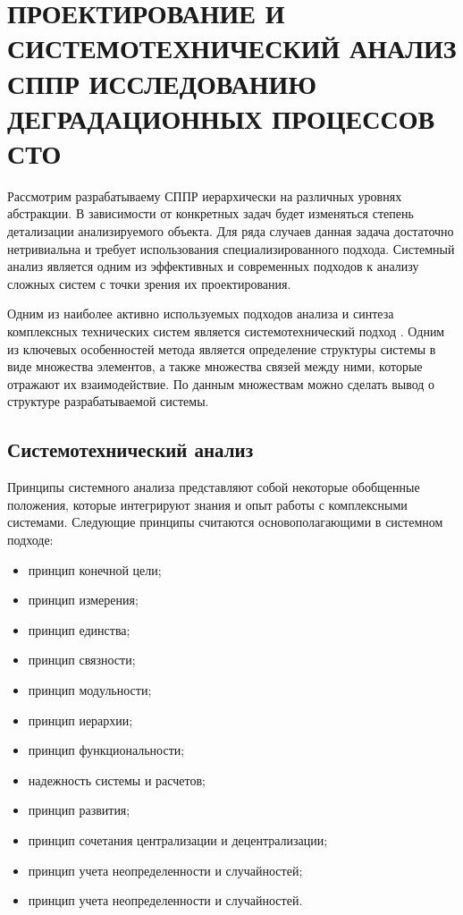 \section{ПРОЕКТИРОВАНИЕ И СИСТЕМОТЕХНИЧЕСКИЙ АНАЛИЗ СППР ИССЛЕДОВАНИЮ ДЕГРАДАЦИОННЫХ ПРОЦЕССОВ СТО}

Рассмотрим разрабатываему СППР иерархически на различных уровнях абстракции. 
В зависимости от конкретных задач будет изменяться степень детализации анализируемого объекта. 
Для ряда случаев данная задача достаточно нетривиальна и требует использования специализированного подхода. 
Системный анализ является одним из эффективных и современных подходов к анализу сложных систем с точки зрения их проектирования.

Одним из наиболее активно используемых подходов анализа и синтеза комплексных технических систем является системотехнический подход \cite{sys-analyz, Litvak}. 
Одним из ключевых особенностей метода является определение структуры системы в виде множества элементов, а также множества связей между ними, которые отражают их взаимодействие. 
По данным множествам можно сделать вывод о структуре разрабатываемой системы.

\subsection{Системотехнический анализ}

Принципы системного анализа представляют собой некоторые обобщенные положения, которые интегрируют знания и опыт работы с комплексными системами. 
Следующие принципы считаются основополагающими в системном подходе: 

\begin{itemize}
    \item принцип конечной цели;
    \item принцип измерения;
    \item принцип единства;
    \item принцип связности;
    \item принцип модульности;
    \item принцип иерархии;
    \item принцип функциональности;
    \item надежность системы и расчетов;
    \item принцип развития;
    \item принцип сочетания централизации и децентрализации;
    \item принцип учета неопределенности и случайностей;
    \item принцип учета неопределенности и случайностей.
\end{itemize}

